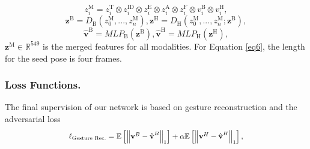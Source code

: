 \documentclass[runningheads]{llncs}
\begin{document}
\begin{equation}
    z^\text{M}_{i} = z^\text{T}_{i} \otimes z^\text{ID}_{i} \otimes z^\text{E}_{i} \otimes z^\text{A}_{i} \otimes z^\text{F}_{i} \otimes v^\text{B}_{i} \otimes v^\text{H}_{i},
    \label{eq6}
\end{equation} 
\begin{equation}
    \textbf{z}^\text{B} = D_\text{B}(z^\text{M}_{0}, ..., z^\text{M}_{n}), \textbf{z}^\text{H} = D_\text{H}(z^\text{M}_{0}, ..., z^\text{M}_{n}; \textbf{z}^\text{B}),
    \label{eq7}
\end{equation} 
\begin{equation}
    \hat{\textbf{v}}^\text{B} = MLP_{\text{B}}(\textbf{z}^\text{B}), 
    \hat{\textbf{v}}^\text{H} = MLP_{\text{H}}(\textbf{z}^\text{H}),
    \label{eq9}
\end{equation}     
$\textbf{z}^\text{M} \in \mathbb{R}^{549}$ is the merged features for all modalities. For Equation \ref{eq6}, the length for the seed pose is four frames.

\vspace{-0.5cm}
\subsubsection{Loss Functions.} The final supervision of our network is based on gesture reconstruction and the adversarial loss
\begin{equation}
\resizebox{.60\hsize}{!}{$
\ell_{\text{Gesture Rec.}} =\mathbb{E}\left[\left\|\textbf{v}^{B}-\hat{\textbf{v}}^{B}\right\|_{1}\right] + \alpha \mathbb{E}\left[\left\|\textbf{v}^{H}-\hat{\textbf{v}}^{H}\right\|_{1}\right],$}
\label{eq10}
\end{equation} 
\end{document}

